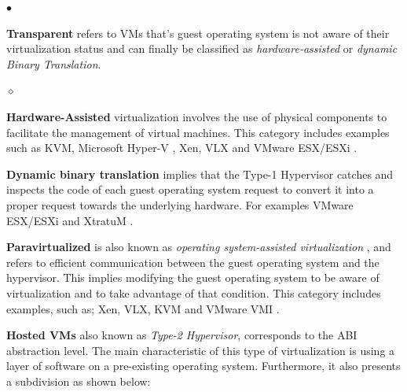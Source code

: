 	\begin{list}{$\bullet$}{\setlength{\leftmargin}{5pt}}

			\item \textbf {Transparent} refers to VMs that's guest operating system is not aware of their virtualization status and can finally be classified as \textit{hardware-assisted} or \textit{dynamic Binary Translation}.
			
			\begin{list}{$\diamond$}{\setlength{\leftmargin}{8pt}}

				\item \textbf{Hardware-Assisted} virtualization involves the use of physical components to facilitate the management of virtual machines. This category includes examples such as KVM, Microsoft Hyper-V \cite{Kappel2009}, Xen, VLX and VMware ESX/ESXi \cite{VMware2018Website}.
				
				\item \textbf{Dynamic binary translation} implies that the Type-1 Hypervisor catches and inspects the code of each guest operating system request to convert it into a proper request towards the underlying hardware. For examples VMware ESX/ESXi and XtratuM \cite{XtratuM}.
				 
			\end{list}
			
			\item \textbf{Paravirtualized} is also known as \textit{operating system-assisted virtualization} \cite{VMware2008}, \cite{VMware2018Website} and refers to efficient communication between the guest operating system and the hypervisor. This implies modifying the guest operating system to be aware of virtualization and to take advantage of that condition. This category includes examples, such as; Xen, VLX, KVM and VMware VMI \cite{VMware2018Website}.
			
		\end{list}	
		
	\textbf{Hosted VMs} also known as \textit{Type-2 Hypervisor}, corresponds to the ABI abstraction level. The main characteristic of this type of virtualization is using a layer of software on a pre-existing operating system. Furthermore, it also presents a subdivision as shown below:
		
